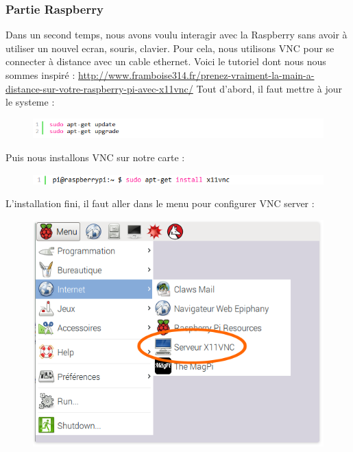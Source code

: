 \documentclass[a4paper,11pt]{report}
\begin{document}
			\subsubsection{Partie Raspberry}
			Dans un second temps, nous avons voulu interagir avec la Raspberry sans avoir à utiliser un nouvel ecran, 			souris, clavier. Pour cela, nous utilisons VNC pour se connecter à distance avec un cable ethernet. \newline
			Voici le tutoriel dont nous nous sommes inspiré :\newline
			\url{http://www.framboise314.fr/prenez-vraiment-la-main-a-distance-sur-votre-raspberry-pi-avec-x11vnc/}
			\newline Tout d'abord, il faut mettre à jour le systeme :
			\begin{figure}[!h]
				\begin{center}
					\includegraphics{Illustrations/1.png}
				\end{center}
			\end{figure}
			\newline Puis nous installons VNC sur notre carte :
			\begin{figure}[!h]
				\begin{center}
					\includegraphics{Illustrations/2.png}
				\end{center}
			\end{figure}
			\newpage L'installation fini, il faut aller dans le menu pour configurer VNC server :
			\begin{figure}[!h]
				\begin{center}
					\includegraphics[scale=0.5]{Illustrations/3.png}
				\end{center}
			\end{figure}
\end{document}
